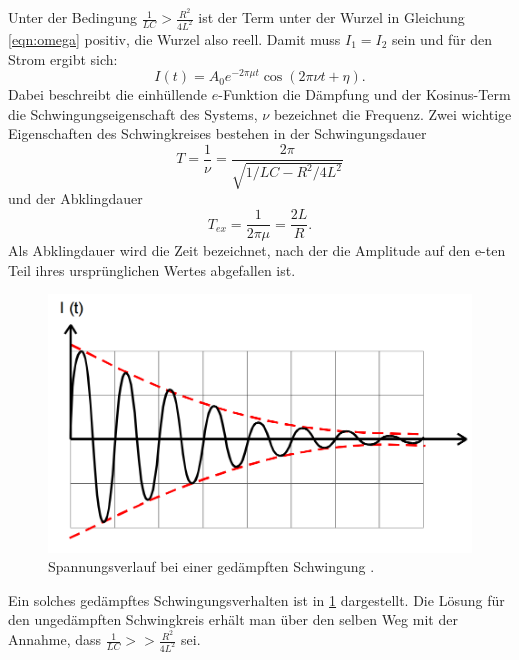 Unter der Bedingung $\frac{1}{LC} > \frac{R^2}{4L^2}$
ist der Term unter der Wurzel in Gleichung
\ref{eqn:omega} positiv,
die Wurzel also reell. Damit muss $I_1 = I_2$ sein und für den Strom ergibt
sich:
\begin{equation}
  I(t) = A_0e^{-2\pi \mu t}\cos{(2\pi \nu t + \eta)}.
  \label{eqn:Ischwingung}
\end{equation}
Dabei beschreibt die einhüllende $e$-Funktion die Dämpfung und der
Kosinus-Term die Schwingungseigenschaft des Systems, $\nu$ bezeichnet die
Frequenz.
Zwei wichtige Eigenschaften des Schwingkreises bestehen in der Schwingungsdauer
\begin{equation}
  T =\frac{1}{\nu} = \frac{2\pi}{\sqrt{1/LC - R^2/4L^2}}
\end{equation}
und der Abklingdauer
\begin{equation}
  T_{ex} = \frac{1}{2\pi\mu} = \frac{2L}{R}.
  \label{eqn:mu}
\end{equation}
Als Abklingdauer wird die Zeit bezeichnet, nach der die Amplitude auf den e-ten
Teil ihres ursprünglichen Wertes abgefallen ist.
\begin{figure}
  \centering
  \includegraphics[width=\textwidth]{gedschwingung.png}
  \caption{Spannungsverlauf bei einer gedämpften Schwingung
  \cite{officialmanual}.}
  \label{fig:gedschw}
\end{figure}
Ein solches gedämpftes Schwingungsverhalten ist in \ref{fig:gedschw} dargestellt.
Die Lösung für den ungedämpften Schwingkreis erhält man über den selben Weg mit
der Annahme, dass $\frac{1}{LC} >> \frac{R^2}{4L^2}$ sei.

